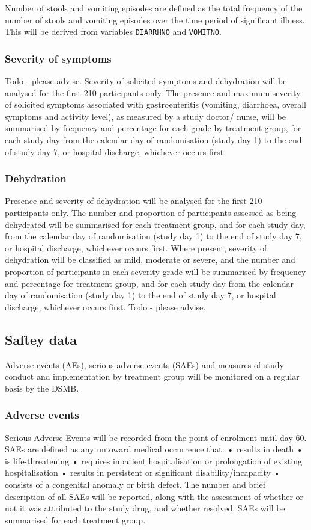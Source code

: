 \documentclass[a4paper]{article}
\begin{document}
Number of stools and vomiting episodes are defined as the total frequency of the number of stools and vomiting episodes over the time period of significant illness.
This will be derived from variables \texttt{DIARRHNO} and \texttt{VOMITNO}.

\subsubsection{Severity of symptoms} 

Todo - please advise.
Severity of solicited symptoms and dehydration will be analysed for the first 210 participants only. The presence and maximum severity of solicited symptoms associated with gastroenteritis (vomiting, diarrhoea, overall symptoms and activity level), as measured by a study doctor/ nurse, will be summarised by frequency and percentage for each grade by treatment group, for each study day from the calendar day of randomisation (study day 1) to the end of study day 7, or hospital discharge, whichever occurs first.


\subsubsection{Dehydration} 
Presence and severity of dehydration will be analysed for the first 210 participants only. The number and proportion of participants assessed as being dehydrated will be summarised for each treatment group, and for each study day, from the calendar day of randomisation (study day 1) to the end of study day 7, or hospital discharge, whichever occurs first. Where present, severity of dehydration will be classified as mild, moderate or severe, and the number and proportion of participants in each severity grade will be summarised by frequency and percentage for treatment group, and for each study day from the calendar day of randomisation (study day 1) to the end of study day 7, or hospital discharge, whichever occurs first.   
Todo - please advise.

\subsection{Saftey data}

Adverse events (AEs), serious adverse events (SAEs) and measures of study conduct and implementation by treatment group will be monitored on a regular basis by the DSMB.

\subsubsection{Adverse events}
Serious Adverse Events will be recorded from the point of enrolment until day 60. SAEs are defined as any untoward medical occurrence that: 
• results in death
• is life-threatening
• requires inpatient hospitalisation or prolongation of existing
hospitalisation
• results in persistent or significant disability/incapacity
• consists of a congenital anomaly or birth defect.
The number and brief description of all SAEs will be reported, along with the assessment of whether or not it was attributed to the study drug, and whether resolved. SAEs will be summarised for each treatment group. 
\end{document}
